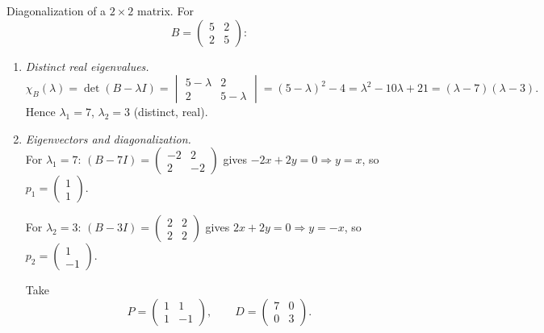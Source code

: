 \documentclass[11pt]{article}
\def\textbf#1{#1}%
\def\mathbf#1{#1}%
\begin{document}
\begin{solution}
\textbf{Diagonalization of a $2\times 2$ matrix.} For
\[
B=\begin{pmatrix}5&2\\[2pt]2&5\end{pmatrix}:
\]
\begin{enumerate}
\item \emph{Distinct real eigenvalues.}
\[
\chi_B(\lambda)=\det(B-\lambda I)=
\begin{vmatrix}5-\lambda&2\\[2pt]2&5-\lambda\end{vmatrix}
=(5-\lambda)^2-4=\lambda^2-10\lambda+21=(\lambda-7)(\lambda-3).
\]
Hence $\lambda_1=7$, $\lambda_2=3$ (distinct, real).

\item \emph{Eigenvectors and diagonalization.}\\
For $\lambda_1=7$: $(B-7I)=\begin{pmatrix}-2&2\\[2pt]2&-2\end{pmatrix}$ gives $-2x+2y=0\Rightarrow y=x$,
so $\mathbf{p}_1=\begin{pmatrix}1\\[2pt]1\end{pmatrix}$.

For $\lambda_2=3$: $(B-3I)=\begin{pmatrix}2&2\\[2pt]2&2\end{pmatrix}$ gives $2x+2y=0\Rightarrow y=-x$,
so $\mathbf{p}_2=\begin{pmatrix}1\\[2pt]-1\end{pmatrix}$.

Take
\[
P=\begin{pmatrix}1&1\\[2pt]1&-1\end{pmatrix},\qquad
D=\begin{pmatrix}7&0\\[2pt]0&3\end{pmatrix}.
\]


\end{enumerate}
\end{solution}
\end{document}
